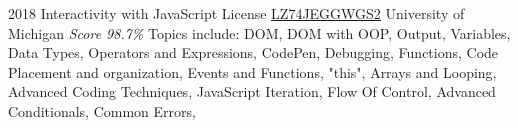 \documentclass[11pt,a4paper]{moderncv}
\begin{document}
\cventry
    {2018}
    {Interactivity with JavaScript}
    {License
        \href{https://www.coursera.org/account/accomplishments/records/LZ74JEGGWGS2}
        {LZ74JEGGWGS2}
    }
    {University of Michigan}
    {\textit{Score 98.7\%}}
    {
        Topics include:                                                                                           %
            DOM,                                                                                                  %
            DOM with OOP,                                                                                         %
            Output,                                                                                               %
            Variables,                                                                                            %
            Data Types,                                                                                           %
            Operators and Expressions,                                                                            %
            CodePen,                                                                                              %
            Debugging,                                                                                            %
            Functions,                                                                                            %
            Code Placement and organization,                                                                      %
            Events and Functions,                                                                                 %
            "this",                                                                                               %
            Arrays and Looping,                                                                                   %
            Advanced Coding Techniques,                                                                           %
            JavaScript Iteration,                                                                                 %
            Flow Of Control,                                                                                      %
            Advanced Conditionals,                                                                                %
            Common Errors,                                                                                        %
}
\end{document}
